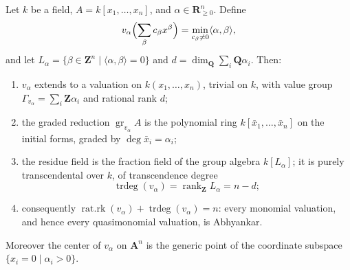 \begin{lemma}
\label{lem:monomial-invariants}
Let $k$ be a field, $A=k[x_1,\ldots,x_n]$, and
$\alpha\in\mathbf R_{\geq0}^n$. Define
\[
 v_\alpha\Bigl(\sum_\beta c_\beta x^\beta\Bigr)
 =\min_{c_\beta\neq0}\langle\alpha,\beta\rangle ,
\]
and let $L_\alpha=\{\beta\in\mathbf Z^n\mid\langle\alpha,\beta\rangle=0\}$
and $d=\dim_{\mathbf Q}\sum_i\mathbf Q\alpha_i$. Then:
\begin{enumerate}
\item $v_\alpha$ extends to a valuation on $k(x_1,\ldots,x_n)$, trivial
      on $k$, with value group
      $\Gamma_{v_\alpha}=\sum_i\mathbf Z\alpha_i$ and rational rank $d$;
\item the graded reduction $\operatorname{gr}_{v_\alpha}A$ is the
      polynomial ring $k[\bar x_1,\ldots,\bar x_n]$ on the initial forms,
      graded by $\deg\bar x_i=\alpha_i$;
\item the residue field is the fraction field of the group algebra
      $k[L_\alpha]$; it is purely transcendental over $k$, of
      transcendence degree
      \[
       \operatorname{trdeg}(v_\alpha)
       =\operatorname{rank}_{\mathbf Z}L_\alpha=n-d ;
      \]
\item consequently
      $\operatorname{rat.rk}(v_\alpha)+\operatorname{trdeg}(v_\alpha)=n$:
      every monomial valuation, and hence every quasimonomial valuation,
      is Abhyankar.
\end{enumerate}
Moreover the center of $v_\alpha$ on $\mathbf A^n$ is the generic point
of the coordinate subspace $\{x_i=0\mid\alpha_i>0\}$.
\end{lemma}
